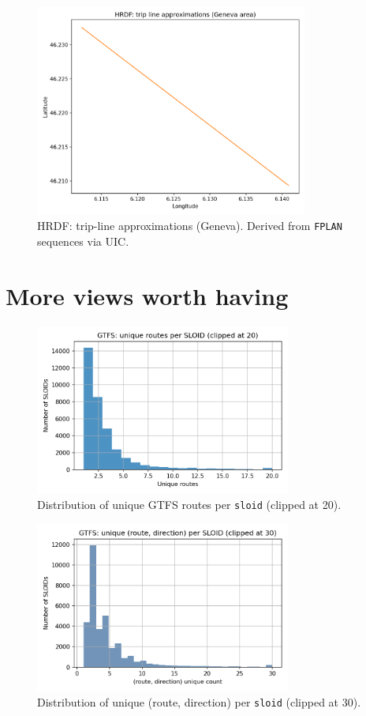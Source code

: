 \begin{figure}[H]
  \centering
  \includegraphics[width=0.8\textwidth]{../figures/chap4/geneva_hrdf_trip_lines.png}
  \caption{HRDF: trip-line approximations (Geneva). Derived from \texttt{FPLAN} sequences via UIC.}
\end{figure}

\section{More views worth having}
\begin{figure}[H]
  \centering
  \includegraphics[width=0.75\textwidth]{../figures/chap4/hist_gtfs_routes_per_sloid.png}
  \caption{Distribution of unique GTFS routes per \texttt{sloid} (clipped at 20).}
\end{figure}

\begin{figure}[H]
  \centering
  \includegraphics[width=0.75\textwidth]{../figures/chap4/hist_gtfs_route_dir_per_sloid.png}
  \caption{Distribution of unique (route, direction) per \texttt{sloid} (clipped at 30).}
\end{figure}

